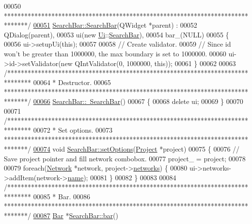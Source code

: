 \begin{DoxyCode}
00050 \textcolor{comment}{*******************************************************************************/}
\hypertarget{searchbar_8cpp_source_l00051}{}\hyperlink{group___window_ga75f8caf009094148f56149b00996ac84}{00051} \hyperlink{group___window_ga75f8caf009094148f56149b00996ac84}{SearchBar::SearchBar}(QWidget *parent) :
00052   QDialog(parent),
00053   ui(new \hyperlink{namespace_ui}{Ui}::\hyperlink{class_search_bar}{SearchBar}),
00054   bar\_(NULL)
00055 \{
00056   ui->setupUi(\textcolor{keyword}{this});
00057 
00058   \textcolor{comment}{// Create validator.}
00059   \textcolor{comment}{// Since id won't be greater than 1000000, the max boundary is set to 1000000.}
00060   ui->id->setValidator(\textcolor{keyword}{new} QIntValidator(0, 1000000, \textcolor{keyword}{this}));
00061 \}
00062 
00063 \textcolor{comment}{/*******************************************************************************}
00064 \textcolor{comment}{* Destructor.}
00065 \textcolor{comment}{*******************************************************************************/}
\hypertarget{searchbar_8cpp_source_l00066}{}\hyperlink{group___window_ga553f2c7b9c15e7ae39cf988a6ef8f786}{00066} \hyperlink{group___window_ga553f2c7b9c15e7ae39cf988a6ef8f786}{SearchBar::~SearchBar}()
00067 \{
00068   \textcolor{keyword}{delete} ui;
00069 \}
00070 
00071 \textcolor{comment}{/*******************************************************************************}
00072 \textcolor{comment}{* Set options.}
00073 \textcolor{comment}{*******************************************************************************/}
\hypertarget{searchbar_8cpp_source_l00074}{}\hyperlink{group___window_ga840eb8fbdea559d31a7c2af6a4cbc480}{00074} \textcolor{keywordtype}{void} \hyperlink{group___window_ga840eb8fbdea559d31a7c2af6a4cbc480}{SearchBar::setOptions}(\hyperlink{class_project}{Project} *project)
00075 \{
00076   \textcolor{comment}{// Save project pointer and fill network combobox.}
00077   project\_ = project;
00078 
00079   \textcolor{keywordflow}{foreach}(\hyperlink{class_network}{Network} *network, project->\hyperlink{class_project_aa98126154cab59769a431668e6f17daf}{networks}) \{
00080     ui->networks->addItem(network->\hyperlink{class_network_ab6643733a517f930c60b06f5ffd78186}{name});
00081   \}
00082 \}
00083 
00084 \textcolor{comment}{/*******************************************************************************}
00085 \textcolor{comment}{* Bar.}
00086 \textcolor{comment}{*******************************************************************************/}
\hypertarget{searchbar_8cpp_source_l00087}{}\hyperlink{group___window_ga25ce5aca2c8db4e81e5357c9a4c01b56}{00087} \hyperlink{class_bar}{Bar} *\hyperlink{group___window_ga25ce5aca2c8db4e81e5357c9a4c01b56}{SearchBar::bar}()

\end{DoxyCode}
